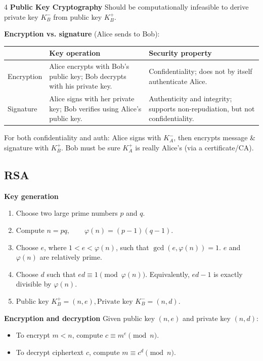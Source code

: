 \documentclass[10pt]{extarticle}
\begin{document}
\begin{multicols}{4}
\textbf{Public Key Cryptography}
Should be computationally infeasible to derive private key $K_B^-$ from public key $K_B^+$.

\textbf{Encryption vs. signature} (Alice sends to Bob):
\begingroup\scriptsize\setlength{\tabcolsep}{2pt}\renewcommand{\arraystretch}{1.02}
\begin{tabular}{@{}>{\raggedright\arraybackslash}p{.20\linewidth}>{\raggedright\arraybackslash}p{.36\linewidth}>{\raggedright\arraybackslash}p{.39\linewidth}@{}}
\toprule
& \textbf{Key operation} & \textbf{Security property} \\
\midrule
Encryption & Alice encrypts with Bob's public key; Bob decrypts with his private key. & Confidentiality; does not by itself authenticate Alice. \\
Signature & Alice signs with her private key; Bob verifies using Alice's public key. & Authenticity and integrity; supports non-repudiation, but not confidentiality. \\
\bottomrule
\end{tabular}\par\endgroup
For both confidentiality and auth: Alice signs with $K_A^-$, then encrypts message \& signature with $K_B^+$. Bob must be sure $K_A^+$ is really Alice's (via a certificate/CA).

\subsection*{RSA}
\textbf{Key generation}
\begin{enumerate}
\item Choose two large prime numbers \(p\) and \(q\).
\item Compute $n = pq, \qquad \varphi(n) = (p-1)(q-1)$.
\item Choose \(e\), where \(1 < e < \varphi(n)\), such that $\gcd(e,\varphi(n)) = 1$. \(e\) and \(\varphi(n)\) are relatively prime.
\item Choose \(d\) such that $ed \equiv 1 \pmod{\varphi(n)}$.
  Equivalently, \(ed-1\) is exactly divisible by \(\varphi(n)\).
\item $\text{Public key } K_B^+ = (n,e), \text{Private key } K_B^- = (n,d)$.
\end{enumerate}

\textbf{Encryption and decryption}
Given public key \((n,e)\) and private key \((n,d)\):

\begin{itemize}
\item To encrypt \(m<n\), compute $c \equiv m^e \pmod n$.
\item To decrypt ciphertext \(c\), compute $m \equiv c^d \pmod n$.
\end{itemize}


\end{multicols}
\end{document}
